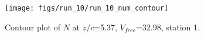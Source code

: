 \begin{figure}[H]
\centering
\texttt{[image: figs/run\_10/run\_10\_num\_contour]}
\caption{Contour plot of $N$ at $z/c$=5.37, $V_{free}$=32.98, station 1.}
\label{fig:run_10_num_contour}
\end{figure}


